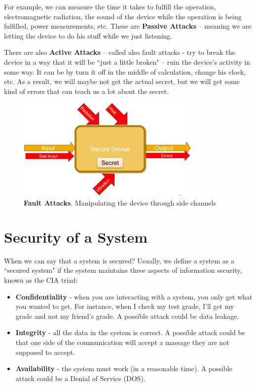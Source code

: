 For example, we can measure the time it takes to fulfill the operation, electromagnetic radiation, the sound of the device while the operation is being fulfilled, power measurements, etc. These are \textbf{Passive Attacks} – meaning we are letting the device to do his stuff while we just listening.

There are also \textbf{Active Attacks} – called also fault attacks -  try to break the device in a way that it will be ``just a little broken" – ruin the device's activity in some way. It can be by turn it off in the middle of calculation, change his clock, etc. As a result, we will maybe not get the actual secret, but we will get some kind of errors that can teach us a lot about the secret. 

\begin{figure}[!ht]
    \centering
    \includegraphics[width=0.8\textwidth]{images/ch1_Intro/Secure_device3.png}
    \caption{\textbf{Fault Attacks}. Manipulating the device through side channels}
    \label{fig:SecDev3}
\end{figure}

\section{Security of a System} \label{sec:SystemSecurity}

When we can say that a system is secured?
Usually, we define a system as a ``secured system" if the system maintains three aspects of information security, known as the CIA\cite{cia} triad:

\begin{itemize}
    \item \textbf{Confidentiality} - when you are interacting with a system, you only get what you wanted to get. For instance, when I check my test grade, I'll get my grade and not my friend's grade. A possible attack could be data leakage.
    \item \textbf{Integrity} - all the data in the system is correct. A possible attack could be that one side of the communication will accept a massage they are not supposed to accept.
    \item \textbf{Availability} - the system must work (in a reasonable time). A possible attack could be a Denial of Service (DOS).
\end{itemize}

